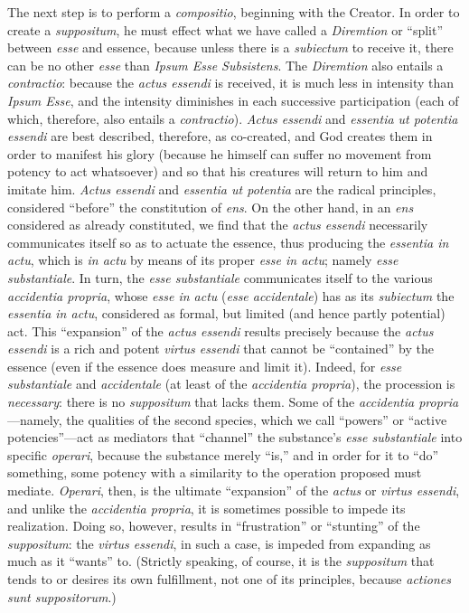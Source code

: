 The next step is to perform a \emph{compositio}, beginning with the Creator. In order to create a \emph{suppositum}, he must effect what we have called a \emph{Diremtion} or “split” between \emph{esse} and essence, because unless there is a \emph{subiectum} to receive it, there can be no other \emph{esse} than \emph{Ipsum Esse Subsistens}. The \emph{Diremtion} also entails a \emph{contractio}: because the \emph{actus essendi} is received, it is much less in intensity than \emph{Ipsum Esse}, and the intensity diminishes in each successive participation (each of which, therefore, also entails a \emph{contractio}). \emph{Actus essendi} and \emph{essentia ut potentia essendi} are best described, therefore, as co-created, and God creates them in order to manifest his glory (because he himself can suffer no movement from potency to act whatsoever) and so that his creatures will return to him and imitate him. \emph{Actus essendi} and \emph{essentia ut potentia} are the radical principles, considered “before” the constitution of \emph{ens}. On the other hand, in an \emph{ens} considered as already constituted, we find that the \emph{actus essendi} necessarily communicates itself so as to actuate the essence, thus producing the \emph{essentia in actu}, which is \emph{in actu} by means of its proper \emph{esse in actu}; namely \emph{esse substantiale}. In turn, the \emph{esse substantiale} communicates itself to the various \emph{accidentia propria}, whose \emph{esse in actu} (\emph{esse accidentale}) has as its \emph{subiectum} the \emph{essentia in actu}, considered as formal, but limited (and hence partly potential) act.  This “expansion” of the \emph{actus essendi} results precisely because the \emph{actus essendi} is a rich and potent \emph{virtus essendi} that cannot be “contained” by the essence (even if the essence does measure and limit it). Indeed, for \emph{esse substantiale} and \emph{accidentale} (at least of the \emph{accidentia propria}), the procession is \emph{necessary}: there is no \emph{suppositum} that lacks them. Some of the \emph{accidentia propria}—namely, the qualities of the second species, which we call “powers” or “active potencies”—act as mediators that “channel” the substance’s \emph{esse substantiale} into specific \emph{operari}, because the substance merely “is,” and in order for it to “do” something, some potency with a similarity to the operation proposed must mediate. \emph{Operari}, then, is the ultimate “expansion” of the \emph{actus} or \emph{virtus essendi}, and unlike the \emph{accidentia propria}, it is sometimes possible to impede its realization. Doing so, however, results in “frustration” or “stunting” of the \emph{suppositum}: the \emph{virtus essendi}, in such a case, is impeded from expanding as much as it “wants” to. (Strictly speaking, of course, it is the \emph{suppositum} that tends to or desires its own fulfillment, not one of its principles, because \emph{actiones sunt suppositorum}.)

